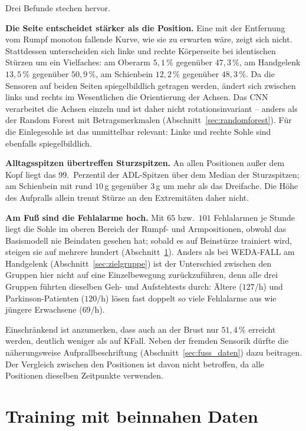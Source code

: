 \documentclass[11pt,a4paper,oneside]{report}
\begin{document}
Drei Befunde stechen hervor.

\textbf{Die Seite entscheidet stärker als die Position.} Eine mit der
Entfernung vom Rumpf monoton fallende Kurve, wie sie zu erwarten wäre,
zeigt sich nicht. Stattdessen unterscheiden sich linke und rechte
Körperseite bei identischen Stürzen um ein Vielfaches: am Oberarm
$5{,}1\,\%$ gegenüber $47{,}3\,\%$, am Handgelenk $13{,}5\,\%$ gegenüber
$50{,}9\,\%$, am Schienbein $12{,}2\,\%$ gegenüber $48{,}3\,\%$. Da
die Sensoren auf beiden Seiten spiegelbildlich getragen werden,
ändert sich zwischen links und rechts im Wesentlichen die Orientierung
der Achsen. Das CNN verarbeitet die Achsen einzeln und ist daher nicht
rotationsinvariant -- anders als der Random Forest mit Betragsmerkmalen
(Abschnitt~\ref{sec:randomforest}). Für die Einlegesohle ist das unmittelbar
relevant: Linke und rechte Sohle sind ebenfalls spiegelbildlich.

\textbf{Alltagsspitzen übertreffen Sturzspitzen.} An allen Positionen
außer dem Kopf liegt das 99.~Perzentil der ADL-Spitzen über dem
Median der Sturzspitzen; am Schienbein mit rund $10$\,g gegenüber
$3$\,g um mehr als das Dreifache. Die Höhe des Aufpralls allein trennt
Stürze an den Extremitäten daher nicht.

\textbf{Am Fuß sind die Fehlalarme hoch.} Mit $65$ bzw.\ $101$
Fehlalarmen je Stunde liegt die Sohle im oberen Bereich der Rumpf- und
Armpositionen, obwohl das Basismodell nie Beindaten gesehen hat; sobald
es auf Beinstürze trainiert wird, steigen sie auf mehrere hundert
(Abschnitt~\ref{sec:fuss_training}). Anders als bei WEDA-FALL am Handgelenk
(Abschnitt~\ref{sec:zielgruppe}) ist der Unterschied zwischen den
Gruppen hier nicht auf eine Einzelbewegung zurückzuführen, denn alle
drei Gruppen führten dieselben Geh- und Aufstehtests durch: Ältere
($127$/h) und Parkinson-Patienten ($120$/h) lösen fast doppelt so viele
Fehlalarme aus wie jüngere Erwachsene ($69$/h).

Einschränkend ist anzumerken, dass auch an der Brust nur $51{,}4\,\%$
erreicht werden, deutlich weniger als auf KFall. Neben der fremden
Sensorik dürfte die näherungsweise Aufprallbeschriftung
(Abschnitt~\ref{sec:fuss_daten}) dazu beitragen. Der Vergleich
zwischen den Positionen ist davon nicht betroffen, da alle Positionen
dieselben Zeitpunkte verwenden.

\section{Training mit beinnahen Daten}
\label{sec:fuss_training}
\end{document}
